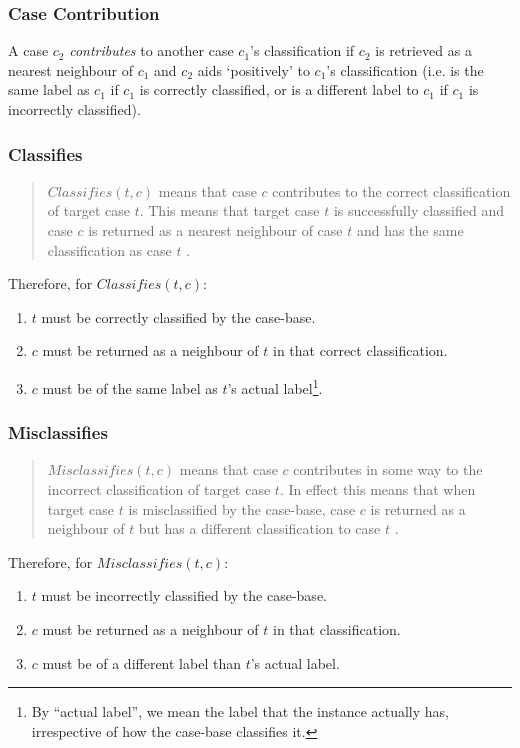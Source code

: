 \documentclass[a4paper,11pt]{report}
\begin{document}
\subsubsection{Case Contribution\label{sec:contributes}}
A case $c_{2}$ \emph{contributes} to another case $c_{1}$'s classification if $c_{2}$ is retrieved as a nearest neighbour of $c_{1}$ and $c_{2}$ aids `positively' to $c_{1}$'s classification (i.e. is the same label as $c_{1}$ if $c_{1}$ is correctly classified, or is a different label to $c_{1}$ if  $c_{1}$ is incorrectly classified).
\subsubsection{Classifies}
\begin{quote}
$ Classifies(t, c) $ means that case $c$ contributes to the correct classification of target case $t$. This means that target case $t$ is successfully classified and case $c$ is returned as a nearest neighbour of case $t$ and has the same classification as case $t$ \citep{Delany2009}.
\end{quote}

Therefore, for $ Classifies(t, c) $:
\begin{enumerate}
	\item $t$ must be correctly classified by the case-base.
	\item $c$ must be returned as a neighbour of $t$ in that correct classification.
	\item $c$ must be of the same label as $t$'s actual label\footnote{By ``actual label'', we mean the label that the instance actually has, irrespective of how the case-base classifies it.}.
\end{enumerate}

\subsubsection{Misclassifies}

\begin{quote}
$ Misclassifies(t, c ) $ means that case $c$ contributes in some way to the incorrect classification of target case $t$. In effect this means that when target case $t$ is misclassified by the case-base, case $c$ is returned as a neighbour of $t$ but has a different classification to case $t$ \citep{Delany2009}.
\end{quote}


Therefore, for $ Misclassifies(t, c) $:
\begin{enumerate}
	\item $t$ must be incorrectly classified by the case-base.
	\item $c$ must be returned as a neighbour of $t$ in that classification.
	\item $c$ must be of a different label than $t$'s actual label.
\end{enumerate}
\end{document}

